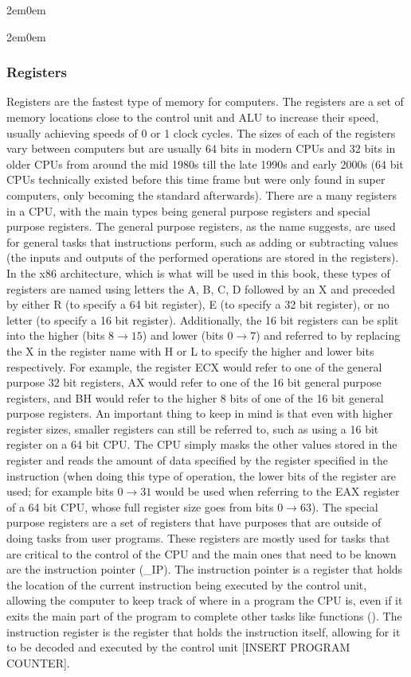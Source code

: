 \documentclass[openany, 12px]{book}
\begin{document}
\begin{adjustwidth}{2em}{0em}
\begin{adjustwidth}{2em}{0em}
\subsubsection{Registers} 
Registers are the fastest type of memory for computers. The registers are a set of memory locations close to the control unit and ALU to increase their speed, usually achieving speeds of 0 or 1 clock cycles. The sizes of each of the registers vary between computers but are usually 64 bits in modern CPUs and 32 bits in older CPUs from around the mid 1980s till the late 1990s and early 2000s (64 bit CPUs technically existed before this time frame but were only found in super computers, only becoming the standard afterwards). There are a many registers in a CPU, with the main types being general purpose registers and special purpose registers. The general purpose registers, as the name suggests, are used for general tasks that instructions perform, such as adding or subtracting values (the inputs and outputs of the performed operations are stored in the registers). In the x86 architecture, which is what will be used in this book, these types of registers are named using letters the A, B, C, D followed by an X and preceded by either R (to specify a 64 bit register), E (to specify a 32 bit register), or no letter (to specify a 16 bit register). Additionally, the 16 bit registers can be split into the higher (bits $8 \rightarrow 15$) and lower (bits $0 \rightarrow 7$) and referred to by replacing the X in the register name with H or L to specify the higher and lower bits respectively. For example, the register ECX would refer to one of the general purpose 32 bit registers, AX would refer to one of the 16 bit general purpose registers, and BH would refer to the higher 8 bits of one of the 16 bit general purpose registers. An important thing to keep in mind is that even with higher register sizes, smaller registers can still be referred to, such as using a 16 bit register on a 64 bit CPU. The CPU simply masks the other values stored in the register and reads the amount of data specified by the register specified in the instruction (when doing this type of operation, the lower bits of the register are used; for example bits $0 \rightarrow 31$ would be used when referring to the EAX register of a 64 bit CPU, whose full register size goes from bits $0 \rightarrow 63$). The special purpose registers are a set of registers that have purposes that are outside of doing tasks from user programs. These registers are mostly used for tasks that are critical to the control of the CPU and the main ones that need to be known are the instruction pointer (\_IP). The instruction pointer is a register that holds the location of the current instruction being executed by the control unit, allowing the computer to keep track of where in a program the CPU is, even if it exits the main part of the program to complete other tasks like functions (). The instruction register is the register that holds the instruction itself, allowing for it to be decoded and executed by the control unit [INSERT PROGRAM COUNTER].
\end{adjustwidth}
\end{adjustwidth}
\end{document}
